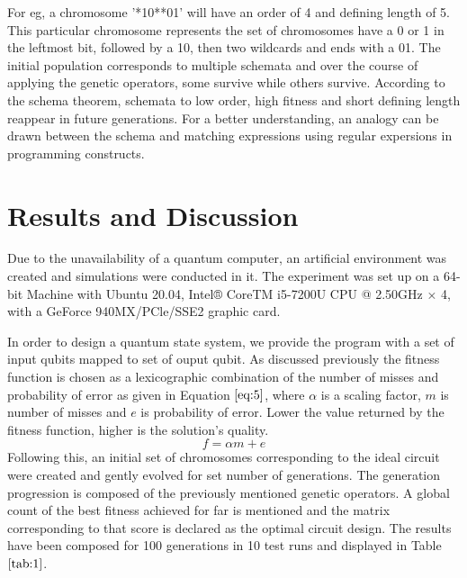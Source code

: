 \documentclass[conference]{IEEEtran}
\begin{document}
For eg, a chromosome '*10**01' will have an order of 4 and defining length of 5. This particular chromosome represents the set of chromosomes have a 0 or 1 in the leftmost bit, followed by a 10, then two wildcards and ends with a 01. The initial population corresponds to multiple schemata and over the course of applying the genetic operators, some survive while others survive. According to the schema theorem, schemata to low order, high fitness and short defining length reappear in future generations. For a better understanding, an analogy can be drawn between the schema and matching expressions using regular expersions in programming constructs.

\section{Results and Discussion}

Due to the unavailability of a quantum computer, an artificial environment was created and simulations were conducted in it. The experiment was set up on a 64-bit Machine with Ubuntu 20.04, Intel® CoreTM i5-7200U CPU @ 2.50GHz × 4, with a GeForce 940MX/PCle/SSE2 graphic card. 

In order to design a quantum state system, we provide the program with a set of input qubits mapped to set of ouput qubit. As discussed previously the fitness function is chosen as a lexicographic combination of the number of misses and probability of error as given in Equation $\ref{eq:5}$, where $\alpha$ is a scaling factor, $\textit{m}$ is number of misses and $\textit{e}$ is probability of error. Lower the value returned by the fitness function, higher is the solution's quality.
{\scriptsize
\begin{equation}
\label{eq:5}
f = \alpha m + e
\end{equation}
}%
Following this, an initial set of chromosomes corresponding to the ideal circuit were created and gently evolved for set number of generations. The generation progression is composed of the previously mentioned genetic operators. A global count of the best fitness achieved for far is mentioned and the matrix corresponding to that score is declared as the optimal circuit design. The results have been composed for 100 generations in 10 test runs and displayed in Table $\ref{tab:1}$.  
\end{document}
